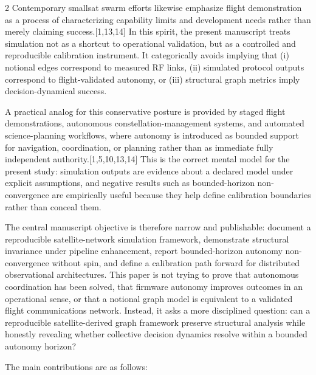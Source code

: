 \documentclass[fleqn,10pt,letterpaper]{article}
\begin{document}
\begin{multicols}{2}
Contemporary smallsat swarm efforts likewise emphasize flight demonstration as a process of characterizing capability limits and development needs rather than merely claiming success.[1,13,14] In this spirit, the present manuscript treats simulation not as a shortcut to operational validation, but as a controlled and reproducible calibration instrument. It categorically avoids implying that (i) notional edges correspond to measured RF links, (ii) simulated protocol outputs correspond to flight-validated autonomy, or (iii) structural graph metrics imply decision-dynamical success.

A practical analog for this conservative posture is provided by staged flight demonstrations, autonomous constellation-management systems, and automated science-planning workflows, where autonomy is introduced as bounded support for navigation, coordination, or planning rather than as immediate fully independent authority.[1,5,10,13,14] This is the correct mental model for the present study: simulation outputs are evidence about a declared model under explicit assumptions, and negative results such as bounded-horizon non-convergence are empirically useful because they help define calibration boundaries rather than conceal them.

The central manuscript objective is therefore narrow and publishable: document a reproducible satellite-network simulation framework, demonstrate structural invariance under pipeline enhancement, report bounded-horizon autonomy non-convergence without spin, and define a calibration path forward for distributed observational architectures. This paper is not trying to prove that autonomous coordination has been solved, that firmware autonomy improves outcomes in an operational sense, or that a notional graph model is equivalent to a validated flight communications network. Instead, it asks a more disciplined question: can a reproducible satellite-derived graph framework preserve structural analysis while honestly revealing whether collective decision dynamics resolve within a bounded autonomy horizon?

The main contributions are as follows:


\end{multicols}
\end{document}
